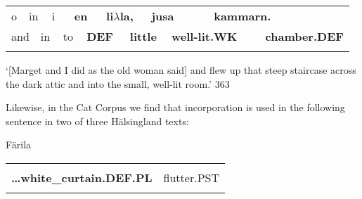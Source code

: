 \begin{tabular}{llllllllllllll}
\lsptoprule
o & \multicolumn{2}{l}{in

} & \multicolumn{2}{l}{i

} & \multicolumn{2}{l}{{\bfseries en}

} & \multicolumn{2}{l}{{\bfseries li$\lambda $la,}

} & \multicolumn{2}{l}{{\bfseries jusa}

} & \multicolumn{2}{l}{{\bfseries kammarn.}

} & \\
\multicolumn{2}{l}{and

} & \multicolumn{2}{l}{in

} & \multicolumn{2}{l}{to 

} & \multicolumn{2}{l}{{\bfseries DEF}

} & \multicolumn{2}{l}{{\bfseries little}

} & \multicolumn{2}{l}{{\bfseries well-lit.WK}

} & \multicolumn{2}{l}{{\bfseries chamber.DEF}

}\\
\lspbottomrule
\end{tabular}

\begin{styleTranslation}
‘[Marget and I did as the old woman said] and flew up that steep staircase across the dark attic and into the small, well-lit room.’ 363

\end{styleTranslation}

\begin{styleBodytextC}
Likewise, in the Cat Corpus we find that incorporation is used in the following sentence in two of three Hälsingland texts:

\end{styleBodytextC}

\begin{listWWNumileveli}
\item {}

\end{listWWNumileveli}

\begin{styleExLtrTblii}
Färila

\end{styleExLtrTblii}

\begin{tabular}{ll}
\lsptoprule
\multicolumn{2}{l}{{\bfseries …vitgardinân}

}\\
{\bfseries …white\_curtain.DEF.PL} & flutter.PST\\
\lspbottomrule
\end{tabular}

